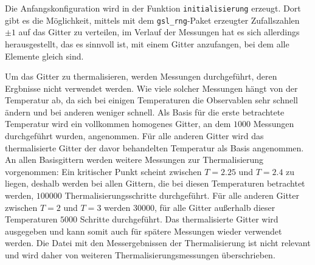 	
	Die Anfangskonfiguration wird in der Funktion \texttt{initialisierung} erzeugt. Dort gibt es die Möglichkeit, mittels mit dem \texttt{gsl\_rng}-Paket\cite{gsldoc} erzeugter Zufallszahlen $\pm 1$ auf das Gitter zu verteilen, im Verlauf der Messungen hat es sich allerdings herausgestellt, das es sinnvoll ist, mit einem Gitter anzufangen, bei dem alle Elemente gleich sind. 
	
	Um das Gitter zu thermalisieren, werden Messungen durchgeführt, deren Ergbnisse nicht verwendet werden. Wie viele solcher Messungen hängt von der Temperatur ab, da sich bei einigen Temperaturen die Observablen sehr schnell ändern und bei anderen weniger schnell. Als Basis für die erste betrachtete Temperatur wird ein vollkommen homogenes Gitter, an dem $\num{1000}$ Messungen durchgeführt wurden, angenommen. Für alle anderen Gitter wird das thermalisierte Gitter der davor behandelten Temperatur als Basis angenommen. An allen Basisgittern werden weitere Messungen zur Thermalisierung vorgenommen: Ein kritischer Punkt scheint zwischen $T=\num{2,25}$ und $T=\num{2,4}$ zu liegen, deshalb werden bei allen Gittern, die bei diesen Temperaturen betrachtet werden, $\num{100000}$ Thermalisierungsschritte durchgeführt. Für alle anderen Gitter zwischen $T=\num{2}$ und $T=\num{3}$ werden $\num{30000}$, für alle Gitter außerhalb dieser Temperaturen $\num{5000}$ Schritte durchgeführt.
	Das thermalisierte Gitter wird ausgegeben und kann somit auch für spätere Messungen wieder verwendet werden. Die Datei mit den Messergebnissen der Thermalisierung ist nicht relevant und wird daher von weiteren Thermalisierungsmessungen überschrieben.
	
